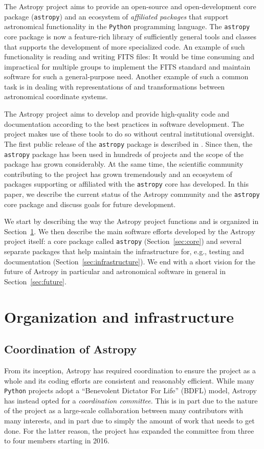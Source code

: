 \documentclass[modern]{aastex61}
\newcommand{\package}[1]{\texttt{#1}\xspace}
\newcommand{\python}{\package{Python}}
\newcommand{\astropy}{Astropy\xspace}
\newcommand{\astropypkg}{\package{astropy}}
\newcommand{\sectionname}{Section\xspace}
\begin{document}
The \astropy project aims to provide an open-source and open-development core
package (\astropypkg) and an ecosystem of \emph{affiliated packages} that
support astronomical functionality in the \python programming language.
The \astropypkg core package is now a feature-rich library of sufficiently
general tools and classes that supports the development of more specialized
code. An example of such functionality is reading and writing FITS files: It would be
time consuming and impractical for multiple groups to implement the FITS
standard \citep{FITS} and maintain software for such a general-purpose need.
Another example of such a common task is in dealing with representations of and
transformations between astronomical coordinate systems.

The \astropy project aims to develop and provide high-quality code and
documentation according to the best practices in software development.
The project makes use of these tools to do so without central institutional
oversight.
The first public release of the \astropypkg package is described in
\cite{astropy}. Since then, the \astropypkg package has been
used in hundreds of projects and the scope of the package has grown
considerably. At the same time, the scientific community
contributing to the project has grown tremendously and an ecosystem
of packages supporting or affiliated with the \astropypkg core has
developed.
In this paper, we describe the current status of the \astropy community and the
\astropypkg core package and discuss goals for future development.

We start by describing the way the \astropy project functions and is organized
in \sectionname~\ref{sec:org}. We then describe the main software efforts
developed by the \astropy project itself: a core package called \astropypkg
(\sectionname~\ref{sec:core}) and several separate packages that help maintain
the infrastructure for, e.g., testing and documentation
(\sectionname~\ref{sec:infrastructure}). We end with a short vision for
the future of \astropy in particular and astronomical software in general
in \sectionname~\ref{sec:future}.

\section{Organization and infrastructure}
\label{sec:org}

\subsection{Coordination of Astropy}
\label{sect:coordcom}
From its inception, \astropy has required coordination to ensure the project
as a whole and its coding efforts are consistent and reasonably efficient.
While many \python projects adopt a ``Benevolent Dictator For Life'' (BDFL)
model, \astropy has instead opted for a \emph{coordination committee}.  This
is in part due to the nature of the project as a large-scale collaboration
between many contributors with many interests, and in part due to simply the
amount of work that needs to get done.  For the latter reason, the
project has expanded the committee from three to four members starting in
2016.
\end{document}
